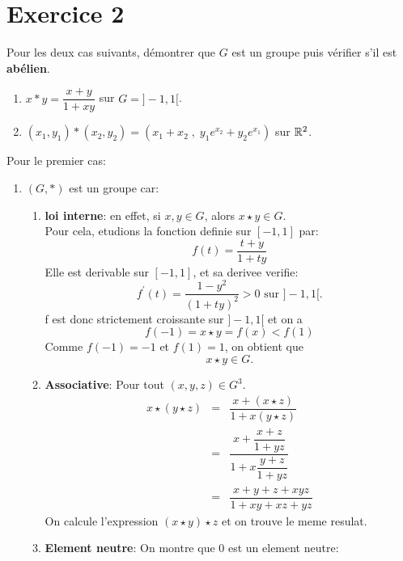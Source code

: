 \documentclass{report}
\begin{document}
\section{Exercice 2}
\qs{}
{
Pour les deux cas suivants, démontrer que $G$ est un groupe puis vérifier s'il
est \textbf{abélien}.
\begin{enumerate}
  \item $x * y = \dfrac{x+y}{1 + xy}$ sur $G= ]-1,1[$.\\[2pt]
  \item $(x_1,y_1)*(x_2,y_2) = (x_1+x_2\;,\; y_1e^{x_2} + y_2e^{x_1})$ sur
    $\mathbb{R}^2$.\\[8pt] 
\end{enumerate}
}

\begin{myproof}
  Pour le premier cas:\\
  \begin{enumerate}
    \item $(G, *)$ est un groupe car:
      \begin{enumerate}
        \item \textbf{loi interne}: en effet, si $x, y\in G$, alors $x \star y \in G$.\\
          Pour cela, etudions la fonction definie sur $[-1,1]$ par:
          $$
          f(t) = \dfrac{t + y}{1 + ty}
          $$
          Elle est derivable sur $[-1,1]$, et sa derivee verifie:
          $$
          f^{'}(t) = \dfrac{1- y^2}{(1 + ty)^2} > 0 \text{ sur } ]-1,1[.
          $$
          f est donc strictement croissante sur $]-1,1[$ et on a 
          $$
          f(-1) = x \star y = f(x) < f(1)
          $$
          Comme $f(-1) = -1$ et $f(1) = 1$, on obtient que 
          $$
          x \star y \in G.
          $$
        \item \textbf{Associative}: Pour tout $(x,y,z)\in G^3$.
          \begin{eqnarray}
            x\star\left(y \star z\right) &=& \dfrac{x + (x\star z)}{ 1 + x(y\star z)}\\
                                         &=& \dfrac{x + \dfrac{x+z}{1 + yz}}{1 + x \dfrac{y + z}{1 + yz}}\\
                                         &=& \dfrac{x + y + z + xyz}{ 1 + xy + xz + yz}
          \end{eqnarray}
          On calcule l'expression $\left(x \star y\right)\star z$ et on trouve le meme resulat.
        \item \textbf{Element neutre}: On montre que $0$ est un element neutre:


\end{enumerate}
\end{enumerate}
\end{myproof}
\end{document}
